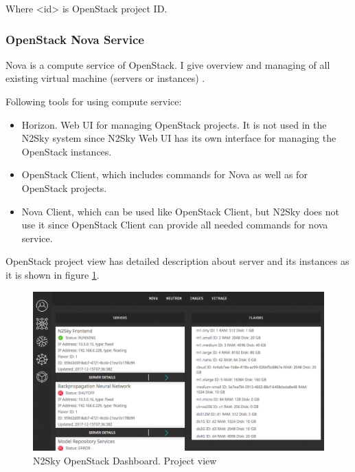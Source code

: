 Where <id> is OpenStack project ID.

\subsubsection{OpenStack Nova Service}\label{OpenStack Nova Service}

Nova is a compute service of OpenStack. I give overview and managing of all existing virtual machine (servers or instances) \cite{Markelov2016}. 

Following tools for using compute service:
\begin{itemize}
\item Horizon. Web UI for managing OpenStack projects. It is not used in the N2Sky system since N2Sky Web UI has its own interface for managing the OpenStack instances.
\item OpenStack Client, which includes commands for Nova as well as for OpenStack projects.
\item Nova Client, which can be used like OpenStack Client, but N2Sky does not use it since OpenStack Client can provide all needed commands for nova service. 
\end{itemize}


OpenStack project view has detailed description about server and its instances as it is shown in figure \ref{fig:openstack_project_view}. 

\begin{figure}[H]
\begin{center}
  \includegraphics[width=\linewidth]{components/4/pics/openstack_project_view.png}
  \caption{N2Sky OpenStack Dashboard. Project view}
  \label{fig:openstack_project_view}
\end{center}
\end{figure}

